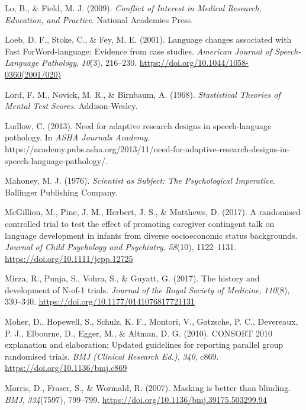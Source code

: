 \documentclass{krantz}
\newlength{\cslhangindent}
\newlength{\cslentryspacingunit} %
\newenvironment{CSLReferences}[2] %
{%
\setlength{\parindent}{0pt}
\ifodd #1
\let\oldpar\par
\def\par{\hangindent=\cslhangindent\oldpar}
\fi
\setlength{\parskip}{#2\cslentryspacingunit}
}%
{}
\begin{document}
\begin{CSLReferences}{1}{0}
\leavevmode{}%
Lo, B., \& Field, M. J. (2009). \emph{Conflict of {Interest} in {Medical Research}, {Education}, and {Practice}}. {National Academies Press}.

\leavevmode{}%
Loeb, D. F., Stoke, C., \& Fey, M. E. (2001). Language changes associated with {Fast ForWord-language}: {Evidence} from case studies. \emph{American Journal of Speech-Language Pathology}, \emph{10}(3), 216--230. \url{https://doi.org/10.1044/1058-0360(2001/020)}

\leavevmode{}%
Lord, F. M., Novick, M. R., \& Birnbaum, A. (1968). \emph{Stastistical {Theories} of {Mental Test Scores}}. {Addison-Wesley}.

\leavevmode{}%
Ludlow, C. (2013). Need for adaptive research designs in speech-language pathology. In \emph{ASHA Journals Academy}. https://academy.pubs.asha.org/2013/11/need-for-adaptive-research-designs-in-speech-language-pathology/.

\leavevmode{}%
Mahoney, M. J. (1976). \emph{Scientist as {Subject}: {The Psychological Imperative}}. {Ballinger Publishing Company}.

\leavevmode{}%
McGillion, M., Pine, J. M., Herbert, J. S., \& Matthews, D. (2017). A randomised controlled trial to test the effect of promoting caregiver contingent talk on language development in infants from diverse socioeconomic status backgrounds. \emph{Journal of Child Psychology and Psychiatry}, \emph{58}(10), 1122--1131. \url{https://doi.org/10.1111/jcpp.12725}

\leavevmode{}%
Mirza, R., Punja, S., Vohra, S., \& Guyatt, G. (2017). The history and development of {N-of-1} trials. \emph{Journal of the Royal Society of Medicine}, \emph{110}(8), 330--340. \url{https://doi.org/10.1177/0141076817721131}

\leavevmode{}%
Moher, D., Hopewell, S., Schulz, K. F., Montori, V., Gøtzsche, P. C., Devereaux, P. J., Elbourne, D., Egger, M., \& Altman, D. G. (2010). {CONSORT} 2010 explanation and elaboration: Updated guidelines for reporting parallel group randomised trials. \emph{BMJ (Clinical Research Ed.)}, \emph{340}, c869. \url{https://doi.org/10.1136/bmj.c869}

\leavevmode{}%
Morris, D., Fraser, S., \& Wormald, R. (2007). Masking is better than blinding. \emph{BMJ}, \emph{334}(7597), 799--799. \url{https://doi.org/10.1136/bmj.39175.503299.94}


\end{CSLReferences}
\end{document}
